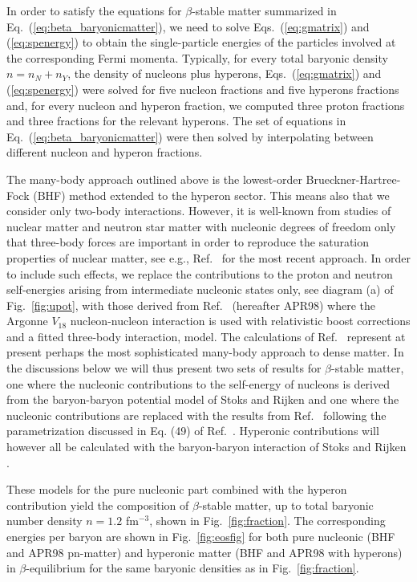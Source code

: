 In order to satisfy the equations for $\beta$-stable matter summarized
in Eq.\ (\ref{eq:beta_baryonicmatter}), we need to solve 
Eqs.\ (\ref{eq:gmatrix}) and (\ref{eq:spenergy}) to obtain 
the single-particle energies of the
particles involved at the corresponding Fermi momenta.
Typically, for every total 
baryonic density $n=n_N+n_Y$, the density of nucleons plus hyperons,
Eqs.\ (\ref{eq:gmatrix}) and (\ref{eq:spenergy}) were solved for five nucleon
fractions and five hyperons fractions and,  for every nucleon and hyperon
fraction, we computed
three proton fractions and three fractions for the relevant hyperons.
The set of equations in Eq.\  (\ref{eq:beta_baryonicmatter}) were
then solved by interpolating between different nucleon and hyperon 
fractions.

The many-body approach outlined above is the lowest-order
Brueckner-Hartree-Fock (BHF) method extended to the hyperon sector. 
This means also that we consider only
two-body interactions. However, it is well-known from studies of nuclear
matter and neutron star matter with nucleonic degrees of freedom only
that three-body forces are important in order to reproduce the saturation 
properties of nuclear matter, see e.g., Ref.\ \cite{apr98} for the most recent
approach.  In order to include such effects, we replace the contributions
to the proton and neutron self-energies arising from intermediate 
nucleonic states only, see diagram (a) of Fig.\ \ref{fig:upot},
with those derived from Ref.\ \cite{apr98} (hereafter APR98) 
where the Argonne $V_{18}$ nucleon-nucleon interaction \cite{v18} is used with
relativistic boost corrections and a fitted three-body interaction,
model. 
The calculations of Ref.\ \cite{apr98} represent at present perhaps
the most sophisticated many-body approach to dense matter. 
In the discussions below we will thus present two sets of results for 
$\beta$-stable matter, one where the nucleonic contributions
to the self-energy of nucleons is derived from the baryon-baryon potential
model of Stoks  and Rijken \cite{sr99} and one where the nucleonic contributions
are replaced with the results from Ref.\ \cite{apr98} following the parametrization
discussed in Eq. (49) of  Ref.\ \cite{hh99}. Hyperonic contributions
will however all be calculated with the baryon-baryon interaction of 
Stoks  and Rijken \cite{sr99}.

These models for the pure nucleonic part combined with the hyperon 
contribution yield
the composition of $\beta$-stable matter, up to total baryonic number density  
$n=1.2$ fm$^{-3}$, shown in Fig.\ 
\ref{fig:fraction}. 
The corresponding energies per baryon  
are shown in Fig.\ \ref{fig:eosfig} for both pure nucleonic
(BHF and APR98 pn-matter) 
and hyperonic matter (BHF and APR98 with hyperons) in $\beta$-equilibrium
for the same baryonic densities as in Fig.\ \ref{fig:fraction}.

